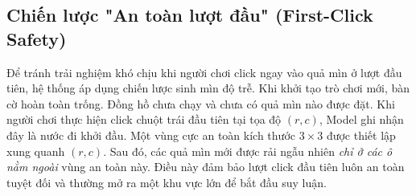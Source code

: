 \subsection{Chiến lược "An toàn lượt đầu" (First-Click Safety)}

Để tránh trải nghiệm khó chịu khi người chơi click ngay vào quả mìn ở lượt đầu tiên, hệ thống áp dụng chiến lược sinh mìn độ trễ.
Khi khởi tạo trò chơi mới, bàn cờ hoàn toàn trống. Đồng hồ chưa chạy và chưa có quả mìn nào được đặt.
Khi người chơi thực hiện click chuột trái đầu tiên tại tọa độ $(r, c)$, Model ghi nhận đây là nước đi khởi đầu. Một vùng cực an toàn kích thước $3 \times 3$ được thiết lập xung quanh $(r, c)$. Sau đó, các quả mìn mới được rải ngẫu nhiên \textit{chỉ ở các ô nằm ngoài} vùng an toàn này. Điều này đảm bảo lượt click đầu tiên luôn an toàn tuyệt đối và thường mở ra một khu vực lớn để bắt đầu suy luận.
